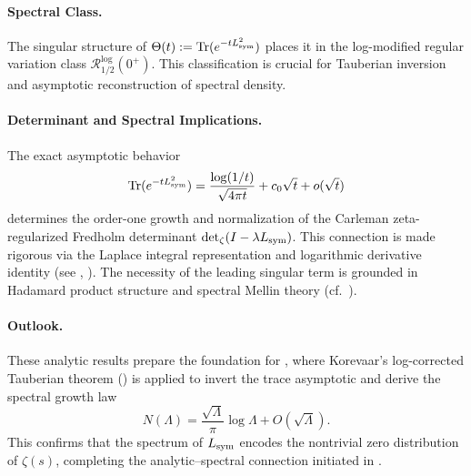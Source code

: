 \paragraph{Spectral Class.}
The singular structure of \( \Theta(t) := \operatorname{Tr}(e^{-t L_{\mathrm{sym}}^2}) \) places it in the log-modified regular variation class \( \mathcal{R}_{1/2}^{\log}(0^+) \). This classification is crucial for Tauberian inversion and asymptotic reconstruction of spectral density.

\paragraph{Determinant and Spectral Implications.}
The exact asymptotic behavior
\[
\operatorname{Tr}(e^{-t L_{\mathrm{sym}}^2}) = \frac{\log(1/t)}{\sqrt{4\pi t}} + c_0 \sqrt{t} + o(\sqrt{t})
\]
determines the order-one growth and normalization of the Carleman zeta-regularized Fredholm determinant \( \det\nolimits_{\zeta}(I - \lambda L_{\mathrm{sym}}) \). This connection is made rigorous via the Laplace integral representation and logarithmic derivative identity (see , ). The necessity of the leading singular term is grounded in Hadamard product structure and spectral Mellin theory (cf.~\cite[Ch.~III]{Korevaar2004Tauberian}).

\paragraph{Outlook.}
These analytic results prepare the foundation for , where Korevaar’s log-corrected Tauberian theorem () is applied to invert the trace asymptotic and derive the spectral growth law
\[
N(\Lambda) = \frac{\sqrt{\Lambda}}{\pi} \log \Lambda + O(\sqrt{\Lambda}).
\]
This confirms that the spectrum of \( L_{\mathrm{sym}} \) encodes the nontrivial zero distribution of \( \zeta(s) \), completing the analytic–spectral connection initiated in .
